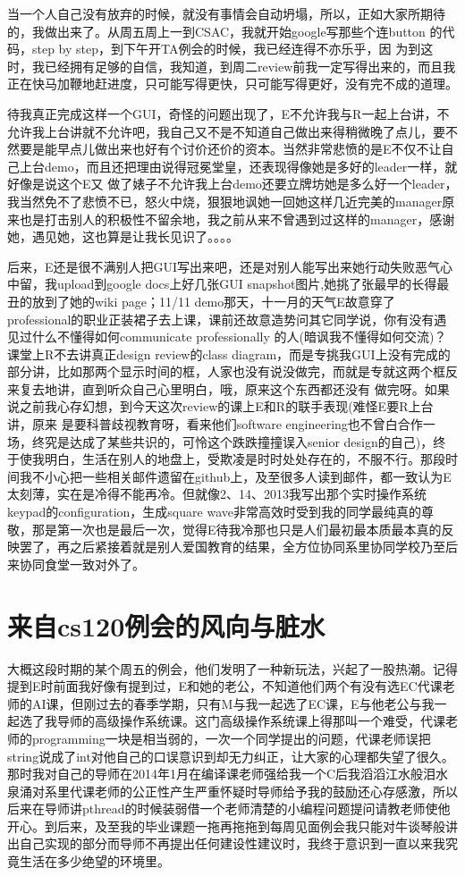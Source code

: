 \documentclass[12pt]{book}
\begin{document}
当一个人自己没有放弃的时候，就没有事情会自动坍塌，所以，正如大家所期待的，我做出来了。从周五周上一到CSAC，我就开始google写那些个连button 的代码，step by step，到下午开TA例会的时候，我已经连得不亦乐乎，因 为到这时，我已经拥有足够的自信，我知道，到周二review前我一定写得出来的，而且我正在快马加鞭地赶进度，只可能写得更快，只可能写得更好，没有完不成的道理。

待我真正完成这样一个GUI，奇怪的问题出现了，E不允许我与R一起上台讲，不允许我上台讲就不允许吧，我自己又不是不知道自己做出来得稍微晚了点儿，要不然要是能早点儿做出来也好有个讨价还价的资本。当然非常悲愤的是E不仅不让自己上台demo，而且还把理由说得冠冕堂皇，还表现得像她是多好的leader一样，就好像是说这个E又 做了婊子不允许我上台demo还要立牌坊她是多么好一个leader，我当然免不了悲愤不已，怒火中烧，狠狠地讽她一回她这样几近完美的manager原来也是打击别人的积极性不留余地，我之前从来不曾遇到过这样的manager，感谢她，遇见她，这也算是让我长见识了。。。。

后来，E还是很不满别人把GUI写出来吧，还是对别人能写出来她行动失败恶气心中留，我upload到google docs上好几张GUI snapshot图片,她挑了张最早的长得最丑的放到了她的wiki page；11/11 demo那天，十一月的天气E故意穿了professional的职业正装裙子去上课，课前还故意造势问其它同学说，你有没有遇见过什么不懂得如何communicate professionally 的人(暗讽我不懂得如何交流)？课堂上R不去讲真正design review的class diagram，而是专挑我GUI上没有完成的部分讲，比如那两个显示时间的框，人家也没有说没做完，而就是专就这两个框反来复去地讲，直到听众自己心里明白，哦，原来这个东西都还没有 做完呀。如果说之前我心存幻想，到今天这次review的课上E和R的联手表现(难怪E要R上台讲，原来 是要科普歧视教育呀，看来他们software engineering也不曾白合作一场，终究是达成了某些共识的，可怜这个跌跌撞撞误入senior design的自己)，终于使我明白，生活在别人的地盘上，受欺凌是时时处处存在的，不服不行。那段时间我不小心把一些相关邮件遗留在github上，及至很多人读到邮件，都一致认为E太刻薄，实在是冷得不能再冷。但就像2、14、2013我写出那个实时操作系统keypad的configuration，生成square wave非常高效时受到我的同学最纯真的尊敬，那是第一次也是最后一次，觉得E待我冷那也只是人们最初最本质最本真的反映罢了，再之后紧接着就是别人爱国教育的结果，全方位协同系里协同学校乃至后来协同食堂一致对外了。

\chapter{来自cs120例会的风向与脏水}
\label{sec-25}

大概这段时期的某个周五的例会，他们发明了一种新玩法，兴起了一股热潮。记得提到E时前面我好像有提到过，E和她的老公，不知道他们两个有没有选EC代课老师的AI课，但刚过去的春季学期，只有M与我一起选了EC课，E与他老公与我一起选了我导师的高级操作系统课。这门高级操作系统课上得那叫一个难受，代课老师的programming一块是相当弱的，一次一个同学提出的问题，代课老师误把string说成了int对他自己的口误意识到却无力纠正，让大家的心理都失望了很久。那时我对自己的导师在2014年1月在编译课老师强给我一个C后我滔滔江水般泪水泉涌对系里代课老师的公正性产生严重怀疑时导师给予我的鼓励还心存感激，所以后来在导师讲pthread的时候装弱借一个老师清楚的小编程问题提问请教老师使他开心。到后来，及至我的毕业课题一拖再拖拖到每周见面例会我只能对牛谈琴般讲出自己实现的部分而导师不再提出任何建设性建议时，我终于意识到一直以来我究竟生活在多少绝望的环境里。
\end{document}
